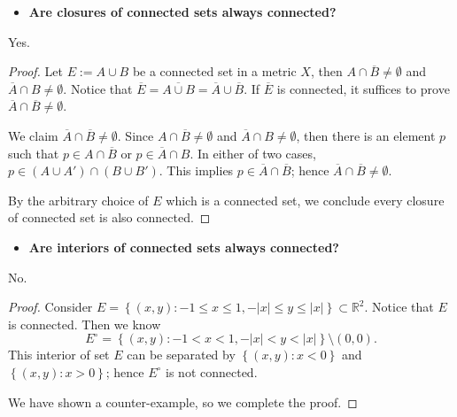 \begin{Exercise}
	\begin{itemize}
		\item \textbf{Are closures of connected sets always connected?}
	\end{itemize}
	\begin{answer}
		Yes.
	\end{answer}
	\begin{proof}
		Let $E := A\cup B$ be a connected set in a metric $X$, then $A\cap\overline{B}\neq\emptyset$ and $\overline{A}\cap B\neq\emptyset$. Notice that $\overline{E} = \overline{A\cup B} = \overline{A}\cup\overline{B}$. If $\overline{E}$ is connected, it suffices to prove $\overline{A}\cap \overline{B}\neq\emptyset$.
		
		We claim $\overline{A}\cap\overline{B}\neq\emptyset$. Since $A\cap\overline{B}\neq\emptyset$ and $\overline{A}\cap B\neq\emptyset$, then there is an element $p$ such that $p\in A\cap\overline{B}$ or $p\in \overline{A}\cap B$. In either of two cases, $p\in (A\cup A')\cap(B\cup B')$. This implies $p\in \overline{A}\cap\overline{B}$; hence $\overline{A}\cap\overline{B}\neq\emptyset$.
		
		By the arbitrary choice of $E$ which is a connected set, we conclude every closure of connected set is also connected.
	\end{proof}
	
	\begin{itemize}
		\item \textbf{Are interiors of connected sets always connected?}
	\end{itemize}
	\begin{answer}
		No.
	\end{answer}
	\begin{proof}
		Consider $E = \left\{(x,y):-1\leq x \leq 1, -|x|\leq y \leq |x|\right\} \subset \mathbb{R}^2$. Notice that $E$ is connected. Then we know
		$$
		E^{\circ} = \left\{(x,y):-1<x<1, -|x|<y<|x|\right\}\setminus(0,0).
		$$
		This interior of set $E$ can be separated by $\left\{(x,y):x<0\right\}$ and $\left\{(x,y):x>0\right\}$; hence $E^{\circ}$ is not connected.
		
		We have shown a counter-example, so we complete the proof.
	\end{proof}
\end{Exercise}